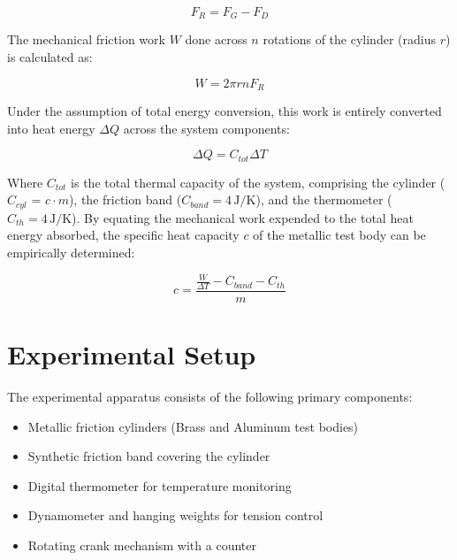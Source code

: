 \documentclass[journal]{IEEEtran}
\begin{document}
\begin{equation} \label{eq:friction_force}
F_R = F_G - F_D
\end{equation}

The mechanical friction work $W$ done across $n$ rotations of the cylinder (radius $r$) is calculated as:

\begin{equation} \label{eq:mechanical_work}
W = 2\pi r n F_R
\end{equation}

Under the assumption of total energy conversion, this work is entirely converted into heat energy $\Delta Q$ across the system components:

\begin{equation} \label{eq:heat_energy}
\Delta Q = C_{tot} \Delta T
\end{equation}

Where $C_{tot}$ is the total thermal capacity of the system, comprising the cylinder ($C_{cyl}$ = $c \cdot m$), the friction band ($C_{band} = 4\,\si{\joule/\kelvin}$), and the thermometer ($C_{th} = 4\,\si{\joule/\kelvin}$). By equating the mechanical work expended to the total heat energy absorbed, the specific heat capacity $c$ of the metallic test body can be empirically determined:

\begin{equation} \label{eq:specific_heat}
c = \frac{\frac{W}{\Delta T} - C_{band} - C_{th}}{m}
\end{equation}

\section{Experimental Setup}
The experimental apparatus consists of the following primary components:
\begin{itemize}
    \item Metallic friction cylinders (Brass and Aluminum test bodies)
    \item Synthetic friction band covering the cylinder
    \item Digital thermometer for temperature monitoring
    \item Dynamometer and hanging weights for tension control
    \item Rotating crank mechanism with a counter
\end{itemize}

\end{document}
